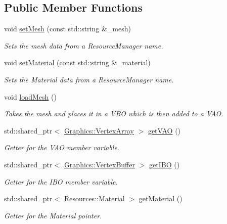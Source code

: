 \subsection*{Public Member Functions}
\begin{DoxyCompactItemize}
\item 
void \hyperlink{class_cookie_eng_1_1_components_1_1_renderable_a4b9903e0bfb81ec574d022d7b2c198af}{set\+Mesh} (const std\+::string \&\+\_\+mesh)
\begin{DoxyCompactList}\small\item\em Sets the mesh data from a Resource\+Manager name. \end{DoxyCompactList}\item 
void \hyperlink{class_cookie_eng_1_1_components_1_1_renderable_a5ea9d1153bbe51b264c20102f8c72db9}{set\+Material} (const std\+::string \&\+\_\+material)
\begin{DoxyCompactList}\small\item\em Sets the Material data from a Resource\+Manager name. \end{DoxyCompactList}\item 
void \hyperlink{class_cookie_eng_1_1_components_1_1_renderable_a8d51c4b3588d81811043a8cce0904c0d}{load\+Mesh} ()
\begin{DoxyCompactList}\small\item\em Takes the mesh and places it in a V\+BO which is then added to a V\+AO. \end{DoxyCompactList}\item 
std\+::shared\+\_\+ptr$<$ \hyperlink{class_cookie_eng_1_1_graphics_1_1_vertex_array}{Graphics\+::\+Vertex\+Array} $>$ \hyperlink{class_cookie_eng_1_1_components_1_1_renderable_a676d79c49c493b4a67a97aa3c3b5c25e}{get\+V\+AO} ()
\begin{DoxyCompactList}\small\item\em Getter for the V\+AO member variable. \end{DoxyCompactList}\item 
std\+::shared\+\_\+ptr$<$ \hyperlink{class_cookie_eng_1_1_graphics_1_1_vertex_buffer}{Graphics\+::\+Vertex\+Buffer} $>$ \hyperlink{class_cookie_eng_1_1_components_1_1_renderable_a57c744030c4b1271c7ceaeedd0c08533}{get\+I\+BO} ()
\begin{DoxyCompactList}\small\item\em Getter for the I\+BO member variable. \end{DoxyCompactList}\item 
std\+::shared\+\_\+ptr$<$ \hyperlink{class_cookie_eng_1_1_resources_1_1_material}{Resources\+::\+Material} $>$ \hyperlink{class_cookie_eng_1_1_components_1_1_renderable_a578ffbbc5b4245ade613d0dcfa571413}{get\+Material} ()
\begin{DoxyCompactList}\small\item\em Getter for the Material pointer. \end{DoxyCompactList}\end{DoxyCompactItemize}
